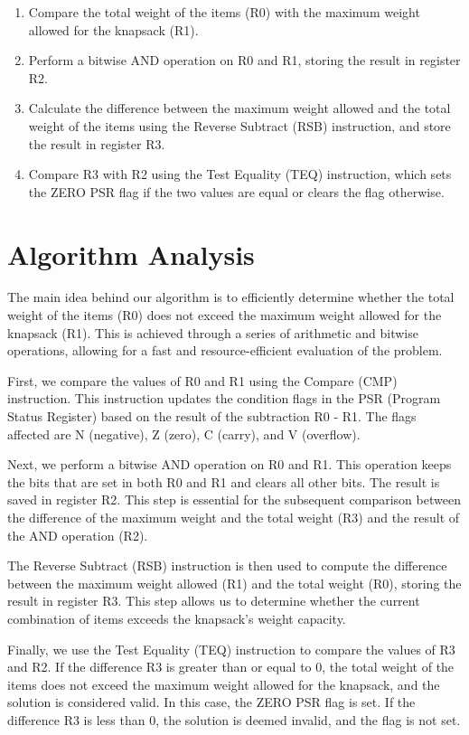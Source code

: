 \begin{enumerate}
\item Compare the total weight of the items (R0) with the maximum weight allowed for the knapsack (R1).
\item Perform a bitwise AND operation on R0 and R1, storing the result in register R2.
\item Calculate the difference between the maximum weight allowed and the total weight of the items using the Reverse Subtract (RSB) instruction, and store the result in register R3.
\item Compare R3 with R2 using the Test Equality (TEQ) instruction, which sets the ZERO PSR flag if the two values are equal or clears the flag otherwise.
\end{enumerate}

\section{Algorithm Analysis}
The main idea behind our algorithm is to efficiently determine whether the total weight of the items (R0) does not exceed the maximum weight allowed for the knapsack (R1). This is achieved through a series of arithmetic and bitwise operations, allowing for a fast and resource-efficient evaluation of the problem.

First, we compare the values of R0 and R1 using the Compare (CMP) instruction. This instruction updates the condition flags in the PSR (Program Status Register) based on the result of the subtraction R0 - R1. The flags affected are N (negative), Z (zero), C (carry), and V (overflow).

Next, we perform a bitwise AND operation on R0 and R1. This operation keeps the bits that are set in both R0 and R1 and clears all other bits. The result is saved in register R2. This step is essential for the subsequent comparison between the difference of the maximum weight and the total weight (R3) and the result of the AND operation (R2).

The Reverse Subtract (RSB) instruction is then used to compute the difference between the maximum weight allowed (R1) and the total weight (R0), storing the result in register R3. This step allows us to determine whether the current combination of items exceeds the knapsack's weight capacity.

Finally, we use the Test Equality (TEQ) instruction to compare the values of R3 and R2. If the difference R3 is greater than or equal to 0, the total weight of the items does not exceed the maximum weight allowed for the knapsack, and the solution is considered valid. In this case, the ZERO PSR flag is set. If the difference R3 is less than 0, the solution is deemed invalid, and the flag is not set.

